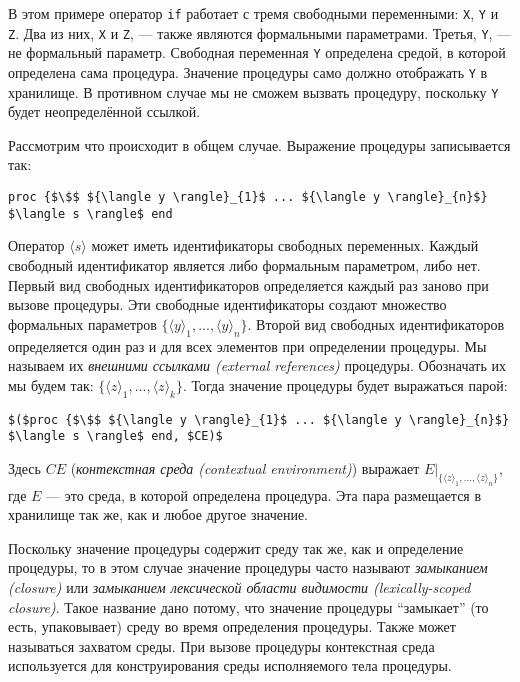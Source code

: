 В этом примере оператор \lstinline|if| работает с тремя свободными переменными: \lstinline|X|, \lstinline|Y| и \lstinline|Z|. Два из них, \lstinline|X| и \lstinline|Z|, --- также являются формальными параметрами. Третья, \lstinline|Y|, --- не формальный параметр. Свободная переменная \lstinline|Y| определена средой, в которой определена сама процедура. Значение процедуры само должно отображать \lstinline|Y| в хранилище. В противном случае мы не сможем вызвать процедуру, поскольку \lstinline|Y| будет неопределённой ссылкой.

Рассмотрим что происходит в общем случае. Выражение процедуры записывается так:

\begin{lstlisting}
proc {$\$$ ${\langle y \rangle}_{1}$ ... ${\langle y \rangle}_{n}$} $\langle s \rangle$ end
\end{lstlisting}

Оператор $\langle s \rangle$ может иметь идентификаторы свободных переменных. Каждый свободный идентификатор является либо формальным параметром, либо нет. Первый вид свободных идентификаторов определяется каждый раз заново при вызове процедуры. Эти свободные идентификаторы создают множество формальных параметров $\{ {\langle y \rangle}_{1}, ..., {\langle y \rangle}_{n}\}$. Второй вид свободных идентификаторов определяется один раз и для всех элементов при определении процедуры. Мы называем их \emph{внешними ссылками (external references)} процедуры. Обозначать их мы будем так: $\{ {\langle z \rangle}_{1}, ..., {\langle z \rangle}_{k}\}$. Тогда значение процедуры будет выражаться парой:

\begin{lstlisting}
$($proc {$\$$ ${\langle y \rangle}_{1}$ ... ${\langle y \rangle}_{n}$} $\langle s \rangle$ end, $CE)$
\end{lstlisting}

Здесь $CE$ (\emph{контекстная среда (contextual environment)}) выражает $E|_{\{ {\langle z \rangle}_{1}, ..., {\langle z \rangle}_{n}\}}$, где $E$ --- это среда, в которой определена процедура. Эта пара размещается в хранилище так же, как и любое другое значение.

Поскольку значение процедуры содержит среду так же, как и определение процедуры, то в этом случае значение процедуры часто называют \emph{замыканием (closure)} или \emph{замыканием лексической области видимости (lexically-scoped closure)}. Такое название дано потому, что значение процедуры ``замыкает'' (то есть, упаковывает) среду во время определения процедуры. Также может называться захватом среды. При вызове процедуры контекстная среда используется для конструирования среды исполняемого тела процедуры.

